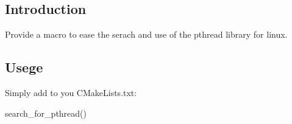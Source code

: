 \subsection*{Introduction}

Provide a macro to ease the serach and use of the pthread library for linux.

\subsection*{Usege}

Simply add to you C\+Make\+Lists.\+txt\+: \begin{DoxyVerb}search_for_pthread()\end{DoxyVerb}
 